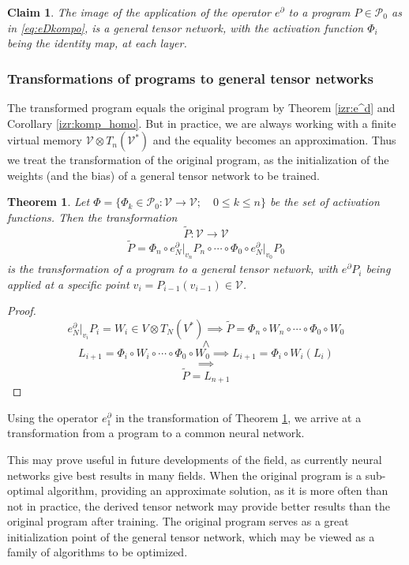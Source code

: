 \documentclass[smallcondensed]{svjour3}
\newcommand{\VV}{\mathcal{V}}
\newcommand{\dP}{\mathcal{P}}
\newcommand{\D}{\partial}
\newtheorem{trditev}{Claim}[section]
\newtheorem{izrek}{Theorem}[section]
\begin{document}
\begin{trditev}
The image of the application of the operator $e^\D$ to a program $P\in\dP_0$ as in \eqref{eq:eDkompo}, is a general tensor network, with the activation function $\Phi_i$ being the identity map, at each layer.
\end{trditev}

\subsubsection{Transformations of programs to general tensor networks}\label{sec:transToNet}

The transformed program equals the original program by Theorem \ref{izr:e^d} and Corollary \ref{izr:komp_homo}. But in practice, we are always working with a finite virtual memory $\VV\otimes T_n(\VV^*)$ and the equality becomes an approximation. Thus we treat the transformation of the original program, as the initialization of the weights (and the bias) of a general tensor network to be trained.  

\begin{izrek}\label{izr:transToTensorNet}
Let $\Phi=\{\Phi_k\in\dP_0:\VV\to\VV;\quad 0\le k\le n\}$ be the set of activation functions. Then the transformation
\begin{equation}
\tilde{P}:\VV\to\VV
\end{equation}
\begin{eqnarray}
\tilde{P}=\Phi_n\circ e^\D_N\vert_{v_n}P_n\circ\cdots\circ\Phi_0\circ e^\D_N\vert_{v_0}P_0
\end{eqnarray}
is the transformation of a program to a general tensor network, with $e^\D P_i$ being applied at a specific point $v_{i}=P_{i-1}(v_{i-1})\in \VV$.
\end{izrek}
\begin{proof}
$$e^\D_N\vert_{v_i} P_i=W_i\in V\otimes T_N(V^*)\implies\tilde{P}=\Phi_n\circ W_n\circ\cdots\circ\Phi_0\circ W_0$$
$$\land$$
$$L_{i+1}=\Phi_i\circ W_i\circ\cdots\circ\Phi_0\circ W_0\implies L_{i+1}=\Phi_i\circ W_i(L_i)$$
$$\implies$$
$$\tilde{P}=L_{n+1}$$
\end{proof}

\begin{corollary}
Using the operator $e^ \D_1$ in the transformation of Theorem \ref{izr:transToTensorNet}, we arrive at a transformation from a program to a common neural network.
\end{corollary}

This may prove useful in future developments of the field, as currently neural networks give best results in many fields. When the original program is a sub-optimal algorithm, providing an approximate solution, as it is more often than not in practice, the derived tensor network may provide better results than the original program after training. The original program serves as a great initialization point of the general tensor network, which may be viewed as a family of algorithms to be optimized. 
\end{document}
